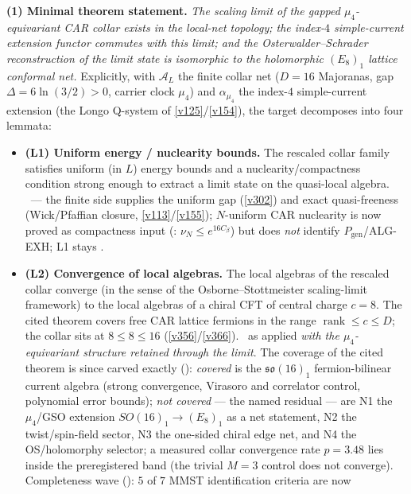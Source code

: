 \par\smallskip\noindent\textbf{(1) Minimal theorem statement.} \emph{The scaling limit of the
gapped $\mu_4$-equivariant CAR collar exists in the local-net topology; the index-$4$
simple-current extension functor commutes with this limit; and the Osterwalder--Schrader
reconstruction of the limit state is isomorphic to the holomorphic $(E_8)_1$ lattice conformal
net.} Explicitly, with $\mathcal A_L$ the finite collar net ($D=16$ Majoranas, gap
$\Delta=6\ln(3/2)>0$, carrier clock $\mu_4$) and $\alpha_{\mu_4}$ the index-$4$ simple-current
extension (the Longo Q-system of \vref{v125}/\vref{v154}), the target decomposes into four
lemmata:
\begin{itemize}
\item \textbf{(L1) Uniform energy / nuclearity bounds.} The rescaled collar family satisfies
  uniform (in $L$) energy bounds and a nuclearity/compactness condition strong enough to extract
  a limit state on the quasi-local algebra. \mO\ --- the finite side supplies the uniform gap
  (\vref{v302}) and exact quasi-freeness (Wick/Pfaffian closure, \vref{v113}/\vref{v155});
  $N$-uniform CAR nuclearity is now proved as compactness input
  (:
  $\nu_N\le e^{16 C_\beta}$) but does \emph{not} identify $P_{\mathrm{gen}}$/ALG-EXH;
  L1 stays \mO.
\item \textbf{(L2) Convergence of local algebras.} The local algebras of the rescaled collar
  converge (in the sense of the Osborne--Stottmeister scaling-limit framework) to the local
  algebras of a chiral CFT of central charge $c=8$. The cited theorem covers free CAR lattice
  fermions in the range $\operatorname{rank}\le c\le D$; the collar sits at $8\le8\le16$
  (\vref{v356}/\vref{v366}). \mO\ as applied \emph{with the $\mu_4$-equivariant structure
  retained through the limit}. The coverage of the cited theorem is since carved exactly
  (): \emph{covered} is the $\mathfrak{so}(16)_1$
  fermion-bilinear current algebra (strong convergence, Virasoro and correlator control,
  polynomial error bounds); \emph{not covered} --- the named residual --- are N1 the
  $\mu_4$/GSO extension $SO(16)_1\to(E_8)_1$ as a net statement, N2 the twist/spin-field
  sector, N3 the one-sided chiral edge net, and N4 the OS/holomorphy selector; a measured
  collar convergence rate $p=3.48$ lies inside the preregistered band (the trivial $M{=}3$
  control does not converge).  Completeness wave
  (): $5$ of $7$ MMST identification criteria are now

\end{itemize}
